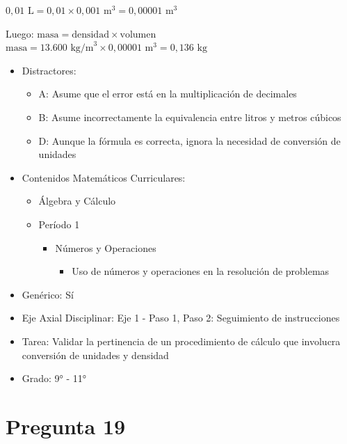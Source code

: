 \documentclass[
]{article}
\providecommand{\tightlist}{%
  \setlength{\itemsep}{0pt}\setlength{\parskip}{0pt}}
\begin{document}
\(0,01 \text{ L} = 0,01 \times 0,001 \text{ m}^3 = 0,00001 \text{ m}^3\)

Luego: \(\text{masa} = \text{densidad} \times \text{volumen}\)
\(\text{masa} = 13.600 \text{ kg/m}^3 \times 0,00001 \text{ m}^3 = 0,136 \text{ kg}\)

\begin{itemize}
\tightlist
\item
  Distractores:

  \begin{itemize}
  \tightlist
  \item
    A: Asume que el error está en la multiplicación de decimales
  \item
    B: Asume incorrectamente la equivalencia entre litros y metros
    cúbicos
  \item
    D: Aunque la fórmula es correcta, ignora la necesidad de conversión
    de unidades
  \end{itemize}
\item
  Contenidos Matemáticos Curriculares:

  \begin{itemize}
  \tightlist
  \item
    Álgebra y Cálculo
  \item
    Período 1

    \begin{itemize}
    \tightlist
    \item
      Números y Operaciones

      \begin{itemize}
      \tightlist
      \item
        Uso de números y operaciones en la resolución de problemas
      \end{itemize}
    \end{itemize}
  \end{itemize}
\item
  Genérico: Sí
\item
  Eje Axial Disciplinar: Eje 1 - Paso 1, Paso 2: Seguimiento de
  instrucciones
\item
  Tarea: Validar la pertinencia de un procedimiento de cálculo que
  involucra conversión de unidades y densidad
\item
  Grado: 9° - 11°
\end{itemize}

\section{Pregunta 19}\label{pregunta-19}
\end{document}
